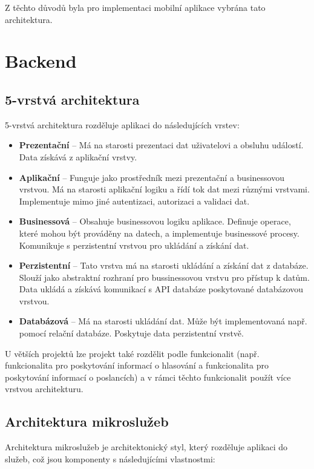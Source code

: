 \noindent Z těchto důvodů byla pro implementaci mobilní aplikace vybrána tato architektura. 

\section{Backend}

\subsection{5-vrstvá architektura}
5-vrstvá architektura \cite{5-tier} rozděluje aplikaci do následujících vrstev:


\begin{itemize}
	\item \textbf{Prezentační} -- Má na starosti prezentaci dat uživatelovi a obsluhu událostí. Data získává \linebreak z aplikační vrstvy.
	
	\item \textbf{Aplikační} -- Funguje jako prostředník mezi prezentační a businessovou vrstvou. Má na starosti aplikační logiku a řídí tok dat mezi různými vrstvami. Implementuje mimo jiné autentizaci, autorizaci a validaci dat.
	
	\item \textbf{Businessová} -- Obsahuje businessovou logiku aplikace. Definuje operace, které mohou být prováděny na datech, a implementuje businessové procesy. Komunikuje s perzistentní vrstvou pro ukládání a získání dat.	
	
	\item \textbf{Perzistentní} -- Tato vrstva má na starosti ukládání a získání dat z databáze. Slouží jako abstraktní rozhraní pro bussinessovou vrstvu pro přístup k datům. Data ukládá a získává komunikací s API databáze poskytované databázovou vrstvou.
	
	\item \textbf{Databázová} -- Má na starosti ukládání dat. Může být implementovaná např. pomocí relační databáze. Poskytuje data perzistentní vrstvě.
	
\end{itemize}

\noindent U větších projektů lze projekt také rozdělit podle funkcionalit (např. funkcionalita pro poskytování informací o hlasování a funkcionalita pro poskytování informací o poslancích) a v rámci těchto funkcionalit použít více vrstvou architekturu.

\subsection{Architektura mikroslužeb}
Architektura mikroslužeb je architektonický styl, který rozděluje aplikaci do služeb, což jsou komponenty s následujícími vlastnostmi:


